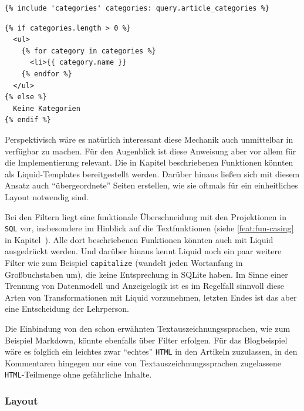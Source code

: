 \begin{lstlisting}[float=h, caption={Verwendung der Liquid-Anweisung \texttt{include}}, label={lst:liquid-include-caller}]
{% include 'categories' categories: query.article_categories %}
\end{lstlisting}

\begin{lstlisting}[float=h, caption={\texttt{categories.liquid}, Template für die Liquid-Anweisung \texttt{include}}, label={lst:liquid-include-template}]
{% if categories.length > 0 %}
  <ul>
    {% for category in categories %}
      <li>{{ category.name }}
    {% endfor %}
  </ul>
{% else %}
  Keine Kategorien
{% endif %}
\end{lstlisting}

Perspektivisch wäre es natürlich interessant diese Mechanik auch unmittelbar in \idename{} verfügbar zu machen. Für den Augenblick ist diese Anweisung aber vor allem für die Implementierung relevant. Die in Kapitel  beschriebenen Funktionen könnten als Liquid-Templates bereitgestellt werden. Darüber hinaus ließen sich mit diesem Ansatz auch "`übergeordnete"' Seiten erstellen, wie sie oftmals für ein einheitliches Layout notwendig sind.

Bei den Filtern liegt eine funktionale Überschneidung mit den Projektionen in \texttt{SQL} vor, insbesondere im Hinblick auf die Textfunktionen (siehe \ref{feat:fun-casing} in Kapitel~). Alle dort beschriebenen Funktionen könnten auch mit Liquid ausgedrückt werden. Und darüber hinaus kennt Liquid noch ein paar weitere Filter wie zum Beispiel \texttt{capitalize} (wandelt jeden Wortanfang in Großbuchstaben um), die keine Entsprechung in SQLite haben. Im Sinne einer Trennung von Datenmodell und Anzeigelogik ist es im Regelfall sinnvoll diese Arten von Transformationen mit Liquid vorzunehmen, letzten Endes ist das aber eine Entscheidung der Lehrperson.

Die Einbindung von den schon erwähnten Textauszeichnungssprachen, wie zum Beispiel Markdown, könnte ebenfalls über Filter erfolgen. Für das Blogbeispiel wäre es folglich ein leichtes zwar "`echtes"' \texttt{HTML} in den Artikeln zuzulassen, in den Kommentaren hingegen nur eine von Textauszeichnungssprachen zugelassene \texttt{HTML}-Teilmenge ohne gefährliche Inhalte.

\subsubsection{Layout}

